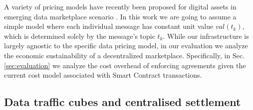 \documentclass[chi_draft]{sigchi}
\begin{document}
%	
%




A variety of pricing models have recently been proposed for digital assets in emerging data marketplace scenario \cite{Sen:2015:SDP:2847579.2756543,Li:2014:TPP:2691190.2691191,7553037,7437020}.
In this work we are going to assume a simple model where each individual message has constant unit value $\mathit{val}(t_k)$, which is determined solely by the message's topic $t_k$. 
While our infrastructure is largely agnostic to the specific data pricing model, in our evaluation we analyze the economic sustainability of a decentralized marketplace. Specifically, in Sec.\ref{sec:evaluation} we analyze the cost overhead of enforcing agreements given the current cost model associated with Smart Contract transactions.

\subsection{Data traffic cubes and centralised settlement}
\end{document}
